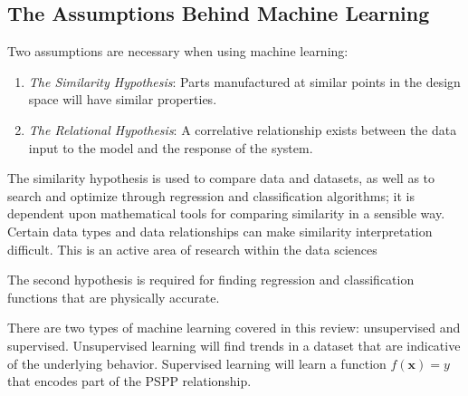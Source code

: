 \subsection{The Assumptions Behind Machine Learning}
Two assumptions are necessary when using machine learning:
\begin{enumerate}
\item \textit{The Similarity Hypothesis}: Parts manufactured at similar points in the design space will have similar properties.
\item \textit{The Relational Hypothesis}: A correlative relationship exists between the data input to the model and the response of the system.
\end{enumerate}

The similarity hypothesis is used to compare data and datasets, as well as to search and optimize through regression and classification algorithms; it is dependent upon mathematical tools for comparing similarity in a sensible way. Certain data types and data relationships can make similarity interpretation difficult. This is an active area of research within the data sciences

The second hypothesis is required for finding regression and classification functions that are physically accurate.

There are two types of machine learning covered in this review: unsupervised and supervised. Unsupervised learning will find trends in a dataset that are indicative of the underlying behavior. Supervised learning will learn a function $f(\mathbf{x}) = y$ that encodes part of the PSPP relationship.



